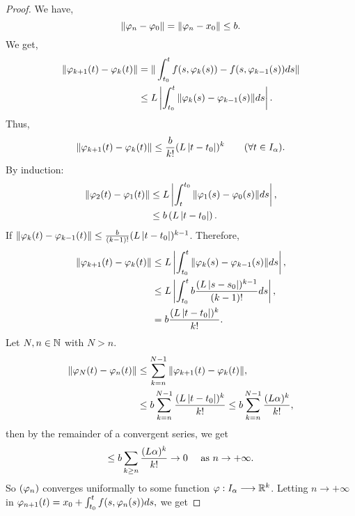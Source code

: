 \begin{proof}
We have, 
\[
\| \varphi _{n} - \varphi _{0} \|  = \| \varphi _{n} - x_0 \|  \leq  b.
\]
We get, 
\begin{align*}
  \| \varphi_{k+1}(t) - \varphi_{k}(t)  \|  &=
  \| \int_{t_0}^{t} f(s, \varphi_{k}(s) ) - f(s, \varphi_{k-1}(s) ) ds \|  \\
                                    & \leq 
                                    L \left| \int_{t_0}^{t} \| \varphi_{k}(s) - \varphi_{k-1}(s)  \| ds \right|.
\end{align*}
Thus,
\[
  \| \varphi_{k+1}(t) - \varphi_{k}(t)  \|  \leq \frac{b}{k!} (L\left| t-t_0 \right|  ) ^{k} \quad 
  \quad (\forall  t \in   I_{\alpha}).
\]
By induction:
\begin{align*}
  \| \varphi_2(t)  - \varphi_1(t)  \| & \leq L
  \left| \int_{t}^{t_0} \| \varphi_1(s) - \varphi_0(s)  \| ds \right|, \\
                              & \leq  b \left( L \left| t-t_0 \right|   \right) .
\end{align*}
If $\| \varphi_{k}(t)  - \varphi_{k-1}(t)  \| \leq \frac{b}{(k-1) !} (L \left| t-t_0 \right|  ) ^{k-1}$. Therefore, 
\begin{align*}
  \| \varphi_{k+1}(t)  - \varphi_{k}(t)  \| &
  \leq L \left| \int_{t_0}^{t} \| \varphi_{k}(s)  - \varphi_{k-1}(s)  \| ds \right| , \\
                                    & \leq L \left| \int_{t_0}^{t} b \frac{(L \left| s-s_0 \right|  ) ^{k-1}}{(k-1) !}ds \right|,   \\
                                    & = b \frac{(L \left| t-t_0 \right|  ) ^{k}}{k!}.
\end{align*}
Let $N, n \in  \mathbb{N} $ with $N > n$.  
\begin{align*}
  \| \varphi_{N}(t)  - \varphi_{n}(t)  \| & \leq 
  \sum_{k=n}^{N-1} \| \varphi_{k+1}(t)  - \varphi_{k}(t)  \|, \\
                                  & \leq 
                                  b \sum_{k=n}^{N-1} 
                                  \frac{(L \left| t-t_0 \right|  ) ^k }{k!} \leq 
                                  b \sum_{k=n}^{N-1} 
                                  \frac{(L \alpha) ^k }{k!},
\end{align*}
then by the remainder of a convergent series, we get
\[
\leq b \sum_{k \geq n}^{} \frac{(L \alpha) ^k }{k!} \rightarrow 0 \quad  \text{ as }   n \rightarrow +\infty .
\]
So $(\varphi_n )  $ converges uniformally to some function 
$ \varphi : I_{\alpha}  \longrightarrow \mathbb{R} ^k  $. Letting $n \rightarrow +\infty  $ in 
$\varphi_{n+1}(t)  = x_0 + \int_{t_0}^{t} f(s, \varphi_n (s) ) ds,$ we get 

\end{proof}
